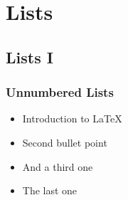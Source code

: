 \documentclass{beamer}
\begin{document}
\section{Lists} 
\subsection{Lists I}
\begin{frame}
   \frametitle{Unnumbered Lists}
   \begin{itemize}
      \item Introduction to  \LaTeX       \item Second bullet point 
      \item And a third one
      \item The last one
   \end{itemize} 
\end{frame}
\end{document}

